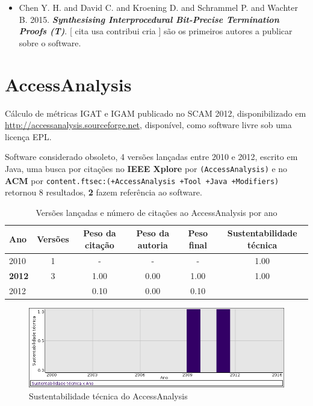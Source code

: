 \begin{itemize}
\item Chen Y. H. and David C. and Kroening D. and Schrammel P. and Wachter B.
      2015.
        \textbf{\textit{ Synthesising Interprocedural Bit-Precise Termination Proofs (T)}}.
      [
          cita
          usa
          contribui
          cria
      ]
são os primeiros autores a publicar sobre o software.
\end{itemize}
\section{AccessAnalysis}

Cálculo de métricas IGAT e IGAM
publicado no SCAM 2012,
disponibilizado em \url{http://accessanalysis.sourceforge.net},
disponível,
como software livre
sob uma licença EPL.

Software considerado obsoleto,
4 versões lançadas
entre 2010 e 2012,
escrito em Java,
uma busca por citações no {\bf IEEE Xplore} por
\texttt{(AccessAnalysis)}
e no {\bf ACM} por
\texttt{content.ftsec:(+AccessAnalysis +Tool +Java +Modifiers)}
retornou
8 resultados,
{\bf 2} fazem referência ao software.


\begin{table}[H]
\caption{Versões lançadas e número de citações ao AccessAnalysis por ano}
\centering
\begin{tabular}{| l | c | c | c | c | c |}
  \hline
  Ano & Versões & Peso da citação & Peso da autoria & Peso final & Sustentabilidade técnica \\
  \hline
        2010 & 1 & - & - & -
        &
          {\color{blue} 1.00}
        \\
\hline
            {\bf 2012}
          &
          3
          &
          1.00
          &
          0.00
          &
          1.00
          &
            {\color{blue} 1.00}
          \\
            2012
          &
          
          &
          0.10
          &
          0.00
          &
          0.10
          &
          \\
\hline
\end{tabular}
\end{table}

\begin{figure}[h]
  \center
  \includegraphics[scale=0.50]{result-documents/charts/accessanalysis.png}
  \caption{Sustentabilidade técnica do AccessAnalysis}
\end{figure}


